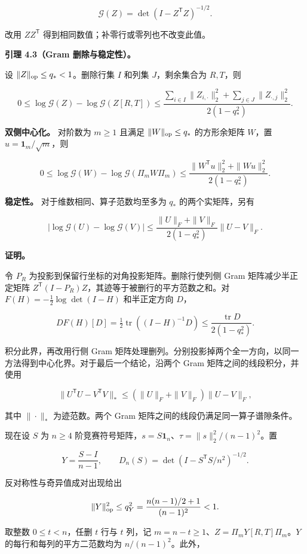 \documentclass[11pt,a4paper]{article}
\begin{document}
\[
\mathcal G(Z)=\det(I-Z^{\mathsf T}Z)^{-1/2}.
\]

改用 \(ZZ^{\mathsf T}\) 得到相同数值；补零行或零列也不改变此值。

\textbf{引理 4.3（Gram 删除与稳定性）。}

设 \(\|Z\|_{\rm op}\le q_*<1\)。删除行集 \(I\) 和列集 \(J\)，剩余集合为 \(R,T\)，则

\[
0\le\log\mathcal G(Z)-\log\mathcal G(Z[R,T])\le\frac{\sum_{i\in I}\|Z_{i,\cdot}\|_2^2+\sum_{j\in J}\|Z_{\cdot,j}\|_2^2}{2(1-q_*^2)}.
\]

\textbf{双侧中心化。} 对阶数为 \(m\ge1\) 且满足 \(\|W\|_{\rm op}\le q_*\) 的方形余矩阵 \(W\)，置 \(u=\mathbf 1_m/\sqrt m\)，则

\[
0\le\log\mathcal G(W)-\log\mathcal G(\Pi_mW\Pi_m)\le\frac{\|W^{\mathsf T}u\|_2^2+\|Wu\|_2^2}{2(1-q_*^2)}.
\]

\textbf{稳定性。} 对于维数相同、算子范数均至多为 \(q_*\) 的两个实矩阵，另有

\[
|\log\mathcal G(U)-\log\mathcal G(V)|\le\frac{\|U\|_F+\|V\|_F}{2(1-q_*^2)}\|U-V\|_F.
\]

\textbf{证明。}

令 \(P_R\) 为投影到保留行坐标的对角投影矩阵。删除行使列侧 Gram 矩阵减少半正定矩阵 \(Z^{\mathsf T}(I-P_R)Z\)，其迹等于被删行的平方范数之和。对 \(F(H)=-\tfrac12\log\det(I-H)\) 和半正定方向 \(D\)，

\[
DF(H)[D]=\tfrac12\operatorname{tr}((I-H)^{-1}D)\le\frac{\operatorname{tr}D}{2(1-q_*^2)}.
\]

积分此界，再改用行侧 Gram 矩阵处理删列。分别投影掉两个全一方向，以同一方法得到中心化界。对于最后一个结论，沿两个 Gram 矩阵之间的线段积分，并使用

\[
\|U^{\mathsf T}U-V^{\mathsf T}V\|_*\le(\|U\|_F+\|V\|_F)\|U-V\|_F,
\]

其中 \(\|\cdot\|_*\) 为迹范数。两个 Gram 矩阵之间的线段仍满足同一算子谱隙条件。

现在设 \(S\) 为 \(n\ge4\) 阶竞赛符号矩阵，\(s=S\mathbf 1_n\)、\(\tau=\|s\|_2^2/(n-1)^2\)。置

\[
Y=\frac{S-I}{n-1},\qquad D_n(S)=\det(I-S^{\mathsf T}S/n^2)^{-1/2}.
\]

反对称性与奇异值成对出现给出

\[
\|Y\|_{\rm op}^2\le q_Y^2=\frac{n(n-1)/2+1}{(n-1)^2}<1.
\]

取整数 \(0\le t<n\)，任删 \(t\) 行与 \(t\) 列，记 \(m=n-t\ge1\)、\(Z=\Pi_mY[R,T]\Pi_m\)。\(Y\) 的每行和每列的平方二范数均为 \(n/(n-1)^2\)。此外，
\end{document}
